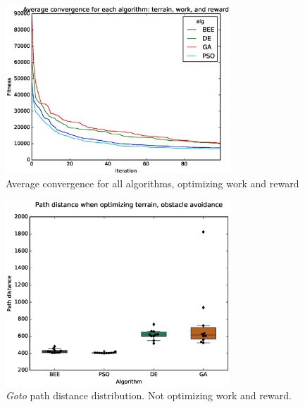 \documentclass{tamuccthesis}
\begin{document}
\begin{figure}
    \captionsetup{justification=centering}
    \centering
        \includegraphics[width=0.75\textwidth,trim={0cm 0.75cm 0cm 0.75cm},clip]{conv_avg_b.eps}
    \caption{Average convergence for all algorithms, optimizing work and reward}
    \label{fig:convergence_b_avg}
\end{figure}




\begin{figure}
    \captionsetup{justification=centering}
    \centering
    \includegraphics[width=0.75\textwidth,trim={0cm 0.75cm 0cm 0.75cm},clip]{EXP3_histo_distance_a.eps}
    \caption{\textit{Goto} path distance distribution. Not optimizing work and reward. }
    \label{fig:algcompare_a_distance}
\end{figure}
\end{document}
